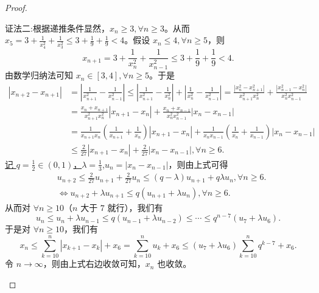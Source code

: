 \documentclass[../../main.tex]{subfiles}
\begin{document}
\begin{proof}
\begin{enumerate}
{\color{blue}证法二:}根据递推条件显然，\(x_n\geqslant 3,\forall n\geqslant 3\)。从而 \(x_5 = 3+\frac{1}{x_{4}^{2}}+\frac{1}{x_{3}^{2}}\leqslant 3+\frac{1}{9}+\frac{1}{9}<4\)。假设 \(x_n\leqslant 4,\forall n\geqslant 5\)，则
\[
x_{n + 1}=3+\frac{1}{x_{n}^{2}}+\frac{1}{x_{n - 1}^{2}}\leqslant 3+\frac{1}{9}+\frac{1}{9}<4.
\]
由数学归纳法可知 \(x_n\in [3,4],\forall n\geqslant 5\)。于是
\begin{align*}
\left| x_{n+2}-x_{n+1} \right|&=\left| \frac{1}{x_{n+1}^{2}}-\frac{1}{x_{n-1}^{2}} \right|\leqslant \left| \frac{1}{x_{n+1}^{2}}-\frac{1}{x_{n}^{2}} \right|+\left| \frac{1}{x_{n}^{2}}-\frac{1}{x_{n-1}^{2}} \right|=\frac{\left| x_{n}^{2}-x_{n+1}^{2} \right|}{x_{n+1}^{2}x_{n}^{2}}+\frac{\left| x_{n-1}^{2}-x_{n}^{2} \right|}{x_{n}^{2}x_{n-1}^{2}}
\\
&=\frac{x_n+x_{n+1}}{x_{n+1}^{2}x_{n}^{2}}\left| x_{n+1}-x_n \right|+\frac{x_n+x_{n-1}}{x_{n}^{2}x_{n-1}^{2}}\left| x_n-x_{n-1} \right|
\\
&=\frac{1}{x_{n+1}x_n}\left( \frac{1}{x_{n+1}}+\frac{1}{x_n} \right) \left| x_{n+1}-x_n \right|+\frac{1}{x_nx_{n-1}}\left( \frac{1}{x_n}+\frac{1}{x_{n-1}} \right) \left| x_n-x_{n-1} \right|
\\
&\leqslant \frac{2}{27}\left| x_{n+1}-x_n \right|+\frac{2}{27}\left| x_n-x_{n-1} \right|,\forall n\geqslant 6.      
\end{align*}
\hyperlink{取q,lambda的原因}{记 \(q = \frac{1}{2}\in(0,1)\)，\(\lambda=\frac{1}{3}\)},\(u_n = |x_n - x_{n - 1}|\)，则由上式可得
\begin{align*}
&u_{n + 2}\leqslant \frac{2}{27}u_{n + 1}+\frac{2}{27}u_n
\leqslant (q - \lambda)u_{n + 1}+q\lambda u_n,\forall n\geqslant 6.\\
&\Leftrightarrow u_{n + 2}+\lambda u_{n + 1}\leqslant q(u_{n + 1}+\lambda u_n),\forall n\geqslant 6.
\end{align*}
从而对 \(\forall n\geqslant 10\)（\(n\) 大于 \(7\) 就行），我们有
\[
u_n\leqslant u_n+\lambda u_{n - 1}\leqslant q(u_{n - 1}+\lambda u_{n - 2})\leqslant\cdots\leqslant q^{n - 7}(u_7+\lambda u_6).
\]
于是对 \(\forall n\geqslant 10\)，我们有
\[
x_n\leqslant \sum_{k = 10}^n|x_{k + 1}-x_k|+x_6=\sum_{k = 10}^n u_k+x_6\leqslant (u_7+\lambda u_6)\sum_{k = 10}^n q^{k - 7}+x_6.
\]
令 \(n\rightarrow\infty\)，则由上式右边收敛可知，\(x_n\) 也收敛。
\end{enumerate}    
\end{proof}
\end{document}
